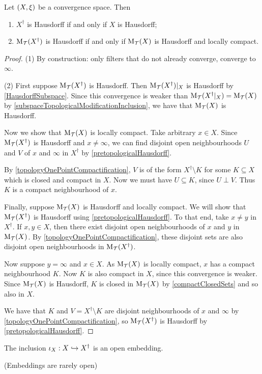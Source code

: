 \begin{proposition} \label{onePointCompactificationHausdorff}
Let $\sSet{X, \xi}$ be a convergence space. Then
\begin{enumerate}
\item $X^\dagger$ is Hausdorff \textup{if and only if} $X$ is Hausdorff;
\item $\operatorname{M_\mathcal{T}}(X^\dagger)$ is Hausdorff \textup{if and only if} $\operatorname{M_\mathcal{T}}(X)$ is Hausdorff and locally compact.
\end{enumerate}
\end{proposition}
\begin{proof}
(1) By construction: only filters that do not already converge, converge to $\infty$.

(2) First suppose $\operatorname{M_\mathcal{T}}(X^\dagger)$ is Hausdorff. Then $\operatorname{M_\mathcal{T}}(X^\dagger)|_X$ is Hausdorff by \ref{HausdorffSubspace}. Since this convergence is weaker than $\operatorname{M_\mathcal{T}}(X^\dagger|_X) = \operatorname{M_\mathcal{T}}(X)$ by \ref{subspaceTopologicalModificationInclusion}, we have that $\operatorname{M_\mathcal{T}}(X)$ is Hausdorff.

Now we show that $\operatorname{M_\mathcal{T}}(X)$ is locally compact. Take arbitrary $x\in X$. Since $\operatorname{M_\mathcal{T}}(X^\dagger)$ is Hausdorff and $x\neq \infty$, we can find disjoint open neighbourhoods $U$ and $V$ of $x$ and $\infty$ in $X^\dagger$ by \ref{pretopologicalHausdorff}.

By \ref{topologyOnePointCompactification}, $V$ is of the form $X^\dagger \setminus K$ for some $K\subseteq X$ which is closed and compact in $X$. Now we must have $U\subseteq K$, since $U\perp V$. Thus $K$ is a compact neighbourhood of $x$.

Finally, suppose $\operatorname{M_\mathcal{T}}(X)$ is Hausdorff and locally compact. We will show that $\operatorname{M_\mathcal{T}}(X^\dagger)$ is Hausdorff using \ref{pretopologicalHausdorff}. To that end, take $x\neq y$ in $X^\dagger$. If $x,y\in X$, then there exist disjoint open neighbourhoods of $x$ and $y$ in $\operatorname{M_\mathcal{T}}(X)$. By \ref{topologyOnePointCompactification}, these disjoint sets are also disjoint open neighbourhoods in $\operatorname{M_\mathcal{T}}(X^\dagger)$.

Now suppose $y = \infty$ and $x\in X$. As $\operatorname{M_\mathcal{T}}(X)$ is locally compact, $x$ has a compact neighbourhood $K$. Now $K$ is also compact in $X$, since this convergence is weaker. Since $\operatorname{M_\mathcal{T}}(X)$ is Hausdorff, $K$ is closed in $\operatorname{M_\mathcal{T}}(X)$ by \ref{compactClosedSets} and so also in $X$.

We have that $K$ and $V = X^\dagger \setminus K$ are disjoint neighbourhoods of $x$ and $\infty$ by \ref{topologyOnePointCompactification}, so $\operatorname{M_\mathcal{T}}(X^\dagger)$ is Hausdorff by \ref{pretopologicalHausdorff}. 
\end{proof}
\begin{corollary}
The inclusion $\operatorname{\iota}_X: X \hookrightarrow X^\dagger$ is an open embedding.
\end{corollary}
(Embeddings are rarely open)


